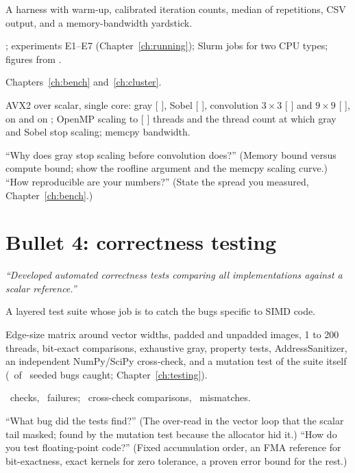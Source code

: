 \begin{description}[leftmargin=2.2cm,style=nextline]
\item[What] A harness with warm-up, calibrated iteration counts, median of repetitions, CSV output, and a memory-bandwidth yardstick.
\item[How] ; experiments E1--E7 (Chapter~\ref{ch:running}); Slurm jobs for two CPU types; figures from .
\item[Where] Chapters~\ref{ch:bench} and~\ref{ch:cluster}.
\item[Key numbers to prepare (yours)] AVX2 over scalar, single core: gray [\,\,], Sobel [\,\,], convolution $3\times3$ [\,\,] and $9\times9$ [\,\,], on  and on ; OpenMP scaling to [\,\,] threads and the thread count at which gray and Sobel stop scaling; memcpy bandwidth.
\item[Expect] ``Why does gray stop scaling before convolution does?'' (Memory bound versus compute bound; show the roofline argument and the memcpy scaling curve.) ``How reproducible are your numbers?'' (State the spread you measured, Chapter~\ref{ch:bench}.)
\end{description}

\section{Bullet 4: correctness testing}
\textit{``Developed automated correctness tests comparing all implementations against a scalar reference.''}

\begin{description}[leftmargin=2.2cm,style=nextline]
\item[What] A layered test suite whose job is to catch the bugs specific to SIMD code.
\item[How] Edge-size matrix around vector widths, padded and unpadded images, 1 to 200 threads, bit-exact comparisons, exhaustive gray, property tests, AddressSanitizer, an independent NumPy/SciPy cross-check, and a mutation test of the suite itself (\mutKilled\ of \mutTotal\ seeded bugs caught; Chapter~\ref{ch:testing}).
\item[Evidence] \testChecks\ checks, \testFailures\ failures; \crossComparisons\ cross-check comparisons, \crossMismatches\ mismatches.
\item[Expect] ``What bug did the tests find?'' (The over-read in the vector loop that the scalar tail masked; found by the mutation test because the allocator hid it.) ``How do you test floating-point code?'' (Fixed accumulation order, an FMA reference for bit-exactness, exact kernels for zero tolerance, a proven error bound for the rest.)
\end{description}

